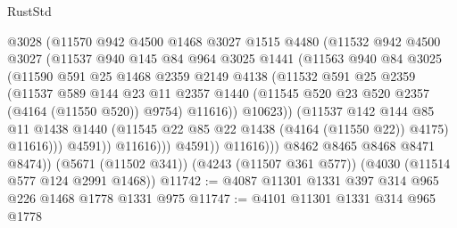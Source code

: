 \begin{lexlean}{RustStd}
\begin{coremodule}
                          @3028
                          (@11570
                            @942
                            @4500
                            @1468
                            @3027
                            @1515
                            @4480
                            (@11532
                              @942
                              @4500
                              @3027
                              (@11537
                                @940
                                @145
                                @84
                                @964
                                @3025
                                @1441
                                (@11563
                                  @940
                                  @84
                                  @3025
                                  (@11590
                                    @591
                                    @25
                                    @1468
                                    @2359
                                    @2149
                                    @4138
                                    (@11532
                                      @591
                                      @25
                                      @2359
                                      (@11537
                                        @589
                                        @144
                                        @23
                                        @11
                                        @2357
                                        @1440
                                        (@11545 @520 @23 @520 @2357 (@4164 (@11550 @520)) @9754)
                                        @11616))
                                    @10623))
                                (@11537
                                  @142
                                  @144
                                  @85
                                  @11
                                  @1438
                                  @1440
                                  (@11545 @22 @85 @22 @1438 (@4164 (@11550 @22)) @4175)
                                  @11616)))
                            @4591))
                        @11616)))
                  @4591))
              @11616)))
        @8462
        @8465
        @8468
        @8471
        @8474))
    (@5671 (@11502 @341))
    (@4243 (@11507 @361 @577))
    (@4030 (@11514 @577 @124 @2991 @1468))
@11742 := @4087 @11301 @1331 @397 @314 @965 @226 @1468 @1778 @1331 @975
@11747 := @4101 @11301 @1331 @314 @965 @1778

\end{coremodule}
\end{lexlean}
